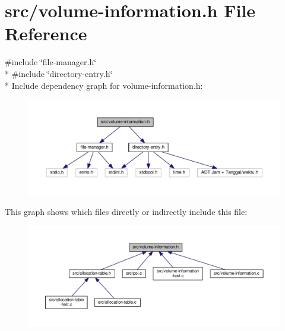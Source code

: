 \hypertarget{volume-information_8h}{\section{src/volume-\/information.h File Reference}
\label{volume-information_8h}
}
{\ttfamily \#include \char`\"{}file-\/manager.\-h\char`\"{}}\\*
{\ttfamily \#include \char`\"{}directory-\/entry.\-h\char`\"{}}\\*
Include dependency graph for volume-\/information.h\-:
\nopagebreak
\begin{figure}[H]
\begin{center}
\leavevmode
\includegraphics[width=350pt]{volume-information_8h__incl}
\end{center}
\end{figure}
This graph shows which files directly or indirectly include this file\-:
\nopagebreak
\begin{figure}[H]
\begin{center}
\leavevmode
\includegraphics[width=350pt]{volume-information_8h__dep__incl}
\end{center}
\end{figure}
